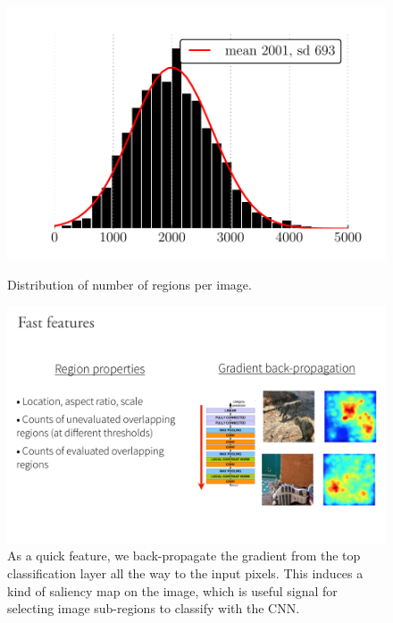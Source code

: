 \begin{figure}[ht]
\centering
\begin{minipage}{.45\textwidth}
\centering
    \includegraphics[width=\linewidth]{figures/roi_hist.pdf}
    \caption{
    Distribution of number of regions per image.
    }\label{fig:roi_hist}
\end{minipage}\hfill%
\begin{minipage}{.45\textwidth}
    \centering
    \includegraphics[width=\linewidth]{figures/gradient_backprop.pdf}
    \caption[Explanation of the gradient back-propagation quick feature.]{
    As a quick feature, we back-propagate the gradient from the top classification layer all the way to the input pixels.
    This induces a kind of saliency map on the image, which is useful signal for selecting image sub-regions to classify with the CNN.
    }\label{fig:gradient_examples}
\end{minipage}
\end{figure}

